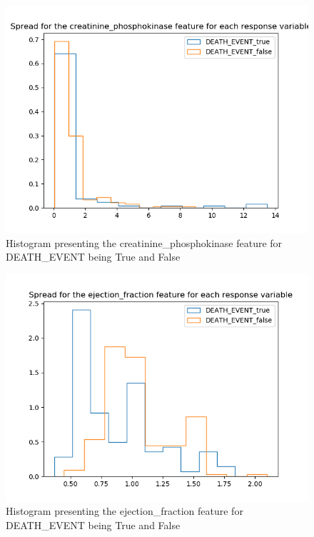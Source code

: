 \documentclass[a4paper, UKenglish]{article}
\newcommand{\0}{\mathbf{0}}
\newcommand{\1}{\mathbf{1}}
\begin{document}
\begin{figure}[H]
        \centering
        \includegraphics[scale=0.6]{images/creatinine_phosphokinase.png}
        \caption{Histogram presenting the creatinine{\_}phosphokinase feature for DEATH{\_}EVENT being True and False}
        \label{fig:creatinine_phosphokinase}
\end{figure}


\begin{figure}[H]
        \centering
        \includegraphics[scale=0.6]{images/ejection_fraction.png}
        \caption{Histogram presenting the ejection{\_}fraction feature for DEATH{\_}EVENT being True and False}
        \label{fig:ejection_fraction}
\end{figure}
\end{document}
